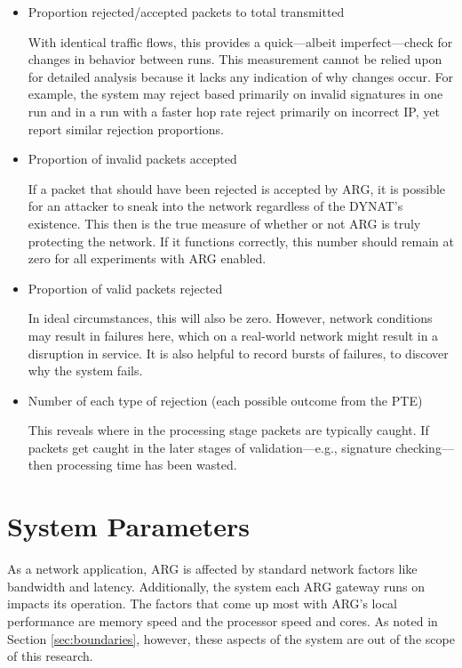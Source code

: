 \begin{itemize}
\item Proportion rejected/accepted packets to total transmitted
	\par With identical traffic flows, this provides a quick---albeit imperfect---check for changes in behavior between runs. This measurement cannot be relied upon for detailed analysis because it lacks any indication of why changes occur. For example, the system may reject based primarily on invalid signatures in one run and in a run with a faster hop rate reject primarily on incorrect IP, yet report similar rejection proportions.

\item Proportion of invalid packets accepted

	If a packet that should have been rejected is accepted by \ac{ARG}, it is possible for an attacker to sneak into the network regardless of the \ac{DYNAT}'s existence. This then is the true measure of whether or not \ac{ARG} is truly protecting the network. If it functions correctly, this number should remain at zero for all experiments with \ac{ARG} enabled.

\item Proportion of valid packets rejected
	\par In ideal circumstances, this will also be zero. However, network conditions may result in failures here, which on a real-world network might result in a disruption in service. It is also helpful to record bursts  of failures, to discover why the system fails.

\item Number of each type of rejection (each possible outcome from the \ac{PTE})
	\par This reveals where in the processing stage packets are typically caught. If packets get caught in the later stages of validation---e.g., signature checking---then processing time has been wasted.
\end{itemize}

\section{System Parameters}
\par As a network application, \ac{ARG} is affected by standard network factors like bandwidth and latency. Additionally, the system each \ac{ARG} gateway runs on impacts its operation. The factors that come up most with \ac{ARG}'s local performance are memory speed and the processor speed and cores. As noted in Section \ref{sec:boundaries}, however, these aspects of the system are out of the scope of this research. 

